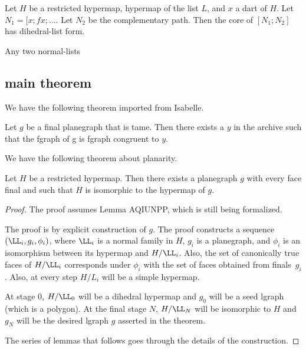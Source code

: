 \begin{lemma}  Let $H$ be a restricted hypermap, hypermap of the list $L$,
and $x$ a dart of $H$.  Let $N_1 = [x;f x;\ldots$. Let $N_2$ be the complementary path.
Then the core of $[N_1;N_2]$ has dihedral-list form.
\begin{lemma}

\begin{lemma} Any two normal-lists
\end{lemma}







\subsection{main theorem}

We have the following theorem imported from Isabelle.

\begin{theorem}  Let $g$ be a final
planegraph that is tame.  Then there exists a $y$ in the archive such
that the fgraph of g is fgraph congruent to $y$.
\end{theorem}

We have the following theorem about planarity.

\begin{theorem} Let $H$ be a restricted hypermap.  Then
  there exists a planegraph $g$ with every
  face final and such that $H$ is isomorphic to the hypermap of $g$.
\end{theorem}

\begin{proof}  The proof assumes Lemma AQIUNPP,
which is still being formalized.

The proof is by explicit construction of $g$.  The proof constructs a
sequence $(\LL_i,g_i,\phi_i)$, where $\LL_i$ is a normal family in
$H$, $g_i$ is a planegraph, and $\phi_i$ is an isomorphism between its
hypermap and $H/\LL_i$.  Also, the set of canonically true faces of
$H/\LL_i$ corresponds under $\phi_i$ with the set of faces obtained
from finals~$g_i$.  Also, at every step $H/L_i$ will be a simple
hypermap.

At stage $0$, $H/\LL_0$ will be a dihedral hypermap and $g_0$ will be
a seed lgraph (which is a polygon).  At the final stage $N$, $H/\LL_N$
will be isomorphic to $H$ and $g_N$ will be the desired lgraph $g$
asserted in the theorem.

The series of lemmas that follows goes through the details
of the construction.
\end{proof}


\end{lemma}
\end{lemma}
